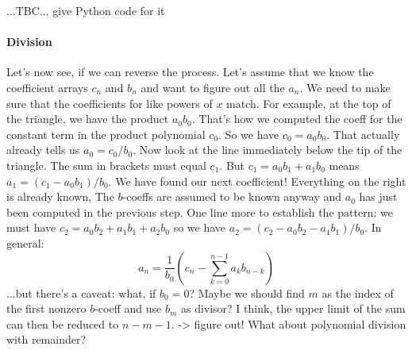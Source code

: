 ...TBC... give Python code for it

\paragraph{Division}
Let's now see, if we can reverse the process. Let's assume that we know the coefficient arrays $c_n$ and $b_n$ and want to figure out all the $a_n$. We need to make sure that the coefficients for like powers of $x$ match. For example, at the top of the triangle, we have the product $a_0 b_0$. That's how we computed the coeff for the constant term in the product polynomial $c_0$. So we have $c_0 = a_0 b_0$. That actually already tells us $a_0 = c_0 / b_0$. Now look at the line immediately below the tip of the triangle. The sum in brackets must equal $c_1$. But $c_1 = a_0 b_1 + a_1 b_0$ means $a_1 = (c_1 -a_0 b_1)/b_0$. We have found our next coefficient! Everything on the right is already known, The $b$-coeffs are assumed to be known anyway and $a_0$ has just been computed in the previous step. One line more to establish the pattern: we must have $c_2 = a_0 b_2 + a_1 b_1 + a_2 b_0$ so we have $a_2 = (c_2 - a_0 b_2 - a_1 b_1)/b_0$. In general:
\begin{equation}
a_n = \frac{1}{b_0} (  c_n - \sum_{k=0}^{n-1} a_k b_{n-k} ) 
\end{equation}
...but there's a caveat: what, if $b_0 = 0$? Maybe we should find $m$ as the index of the first nonzero $b$-coeff and use $b_m$ as divisor? I think, the upper limit of the sum can then be reduced to $n-m-1$. -> figure out! What about polynomial division with remainder?



